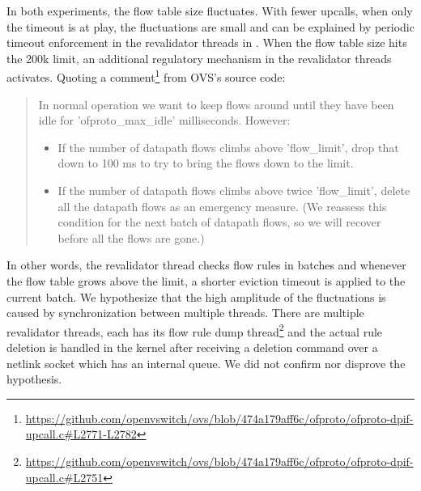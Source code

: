 In both experiments, the flow table size fluctuates. With fewer upcalls, when only the timeout is at play, the fluctuations are small and can be explained by periodic timeout enforcement in the revalidator threads in . When the flow table size hits the 200k limit, an additional regulatory mechanism in the revalidator threads activates. Quoting a comment\footnote{\url{https://github.com/openvswitch/ovs/blob/474a179aff6c/ofproto/ofproto-dpif-upcall.c\#L2771-L2782}} from OVS's source code:

\begin{quote}
    In normal operation we want to keep flows around until they have
    been idle for 'ofproto\_max\_idle' milliseconds.  However:

    \begin{itemize}
        \item If the number of datapath flows climbs above 'flow\_limit', drop that down to 100 ms to try to bring the flows down to the limit.

        \item If the number of datapath flows climbs above twice 'flow\_limit', delete all the datapath flows as an emergency measure.  (We reassess this condition for the next batch of datapath flows, so we will recover before all the flows are gone.)
    \end{itemize}
\end{quote}

In other words, the revalidator thread checks flow rules in batches and whenever the flow table grows above the limit, a shorter eviction timeout is applied to the current batch. We hypothesize that the high amplitude of the fluctuations is caused by synchronization between multiple threads. There are multiple revalidator threads, each has its flow rule dump thread\footnote{\url{https://github.com/openvswitch/ovs/blob/474a179aff6c/ofproto/ofproto-dpif-upcall.c\#L2751}} and the actual rule deletion is handled in the kernel after receiving a deletion command over a netlink socket which has an internal queue. We did not confirm nor disprove the hypothesis.

% 

